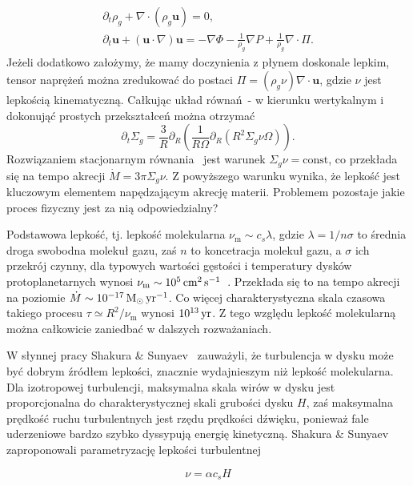 \begin{gather}
   \partial_t \rho_g + \nabla\cdot\left(\rho_g\mathbf{u}\right) = 0,
   \label{eq:ns1}\\
\partial_t \mathbf{u} + \left(\mathbf{u}\cdot\nabla\right)\mathbf{u} = 
-\nabla\Phi -\frac{1}{\rho_g} \nabla P + \frac{1}{\rho_g} \nabla \cdot \Pi.
\label{eq:ns2}
\end{gather}
Jeżeli dodatkowo założymy, że mamy doczynienia z płynem doskonale lepkim, tensor
naprężeń można zredukować do postaci $\Pi = (\rho_g \nu)\nabla\cdot\mathbf{u}$,
gdzie $\nu$ jest lepkością kinematyczną. Całkując układ
równań~- w kierunku wertykalnym i dokonująć prostych
przekształceń można otrzymać
\begin{equation}\label{eq:sigma}
   \partial_t \Sigma_g =
   \frac{3}{R}\partial_R\left(\frac{1}{R\Omega}\partial_R\left(R^2\Sigma_g \nu
         \Omega\right)\right).
\end{equation}
Rozwiązaniem stacjonarnym równania~ jest warunek $\Sigma_g\nu =
\textrm{const}$, co przekłada się na tempo akrecji $\dot{M} = 3\pi\Sigma_g\nu$.
Z powyższego warunku wynika, że lepkość jest kluczowym elementem napędzającym
akrecję materii. Problemem pozostaje jakie proces fizyczny jest za nią
odpowiedzialny?
\par Podstawowa lepkość, tj. lepkość molekularna $\nu_{\textrm{m}} \sim c_s
\lambda$, gdzie $\lambda = 1 / n\sigma$ to średnia droga swobodna molekuł gazu,
zaś $n$ to koncetracja molekuł gazu, a $\sigma$ ich przekrój czynny, dla
typowych wartości gęstości i temperatury dysków protoplanetarnych wynosi
$\nu_{\textrm{m}}\sim10^5\hbox{$\thinspace\textrm{cm}$}^2\hbox{$\thinspace\textrm{s}$}^{-1}$~\cite{armitage}. Przekłada się to na
tempo akrecji na poziomie $\dot{M}\sim 10^{-17}\hbox{$\mathrm{\thinspace M_{\odot}}$}\hbox{$\thinspace\textrm{yr}$}^{-1}$. Co więcej
charakterystyczna skala czasowa takiego procesu $\tau \simeq R^2 /
\nu_{\textrm{m}}$ wynosi $10^{13}\hbox{$\thinspace\textrm{yr}$}$. Z tego względu lepkość molekularną można
całkowicie zaniedbać w dalszych rozważaniach.
\par W słynnej pracy Shakura \& Sunyaev~\citep{SS73} zauważyli, że turbulencja
w dysku może być dobrym źródłem lepkości, znacznie wydajnieszym niż lepkość
molekularna. Dla izotropowej turbulencji, maksymalna skala wirów w dysku jest
proporcjonalna do charakterystycznej skali grubości dysku $H$, zaś maksymalna
prędkość ruchu turbulentnych jest rzędu prędkości dźwięku, ponieważ fale
uderzeniowe bardzo szybko dyssypują energię kinetyczną. Shakura \& Sunyaev
zaproponowali parametryzację lepkości turbulentnej

\begin{equation}\label{eq:alpha}
\nu = \alpha c_s H
\end{equation}

